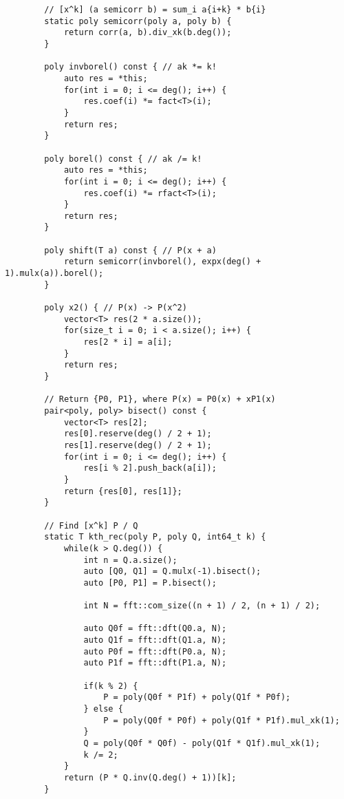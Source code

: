 \begin{lstlisting}
        // [x^k] (a semicorr b) = sum_i a{i+k} * b{i}
        static poly semicorr(poly a, poly b) {
            return corr(a, b).div_xk(b.deg());
        }
        
        poly invborel() const { // ak *= k!
            auto res = *this;
            for(int i = 0; i <= deg(); i++) {
                res.coef(i) *= fact<T>(i);
            }
            return res;
        }
        
        poly borel() const { // ak /= k!
            auto res = *this;
            for(int i = 0; i <= deg(); i++) {
                res.coef(i) *= rfact<T>(i);
            }
            return res;
        }
        
        poly shift(T a) const { // P(x + a)
            return semicorr(invborel(), expx(deg() + 1).mulx(a)).borel();
        }
        
        poly x2() { // P(x) -> P(x^2)
            vector<T> res(2 * a.size());
            for(size_t i = 0; i < a.size(); i++) {
                res[2 * i] = a[i];
            }
            return res;
        }
        
        // Return {P0, P1}, where P(x) = P0(x) + xP1(x)
        pair<poly, poly> bisect() const {
            vector<T> res[2];
            res[0].reserve(deg() / 2 + 1);
            res[1].reserve(deg() / 2 + 1);
            for(int i = 0; i <= deg(); i++) {
                res[i % 2].push_back(a[i]);
            }
            return {res[0], res[1]};
        }
        
        // Find [x^k] P / Q
        static T kth_rec(poly P, poly Q, int64_t k) {
            while(k > Q.deg()) {
                int n = Q.a.size();
                auto [Q0, Q1] = Q.mulx(-1).bisect();
                auto [P0, P1] = P.bisect();
                
                int N = fft::com_size((n + 1) / 2, (n + 1) / 2);
                
                auto Q0f = fft::dft(Q0.a, N);
                auto Q1f = fft::dft(Q1.a, N);
                auto P0f = fft::dft(P0.a, N);
                auto P1f = fft::dft(P1.a, N);
                
                if(k % 2) {
                    P = poly(Q0f * P1f) + poly(Q1f * P0f);
                } else {
                    P = poly(Q0f * P0f) + poly(Q1f * P1f).mul_xk(1);
                }
                Q = poly(Q0f * Q0f) - poly(Q1f * Q1f).mul_xk(1);
                k /= 2;
            }
            return (P * Q.inv(Q.deg() + 1))[k];
        }
        

\end{lstlisting}
